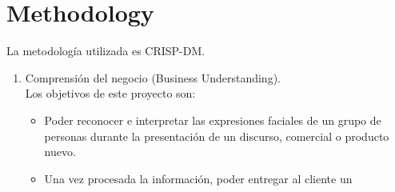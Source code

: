 
\section{Methodology}

La metodología utilizada es CRISP-DM.\@
\begin{enumerate}
      \item Comprensión del negocio (Business Understanding). \\Los objetivos de este
            proyecto son:
            \begin{itemize}
                  \item Poder reconocer e interpretar las expresiones faciales de un grupo de personas
                        durante la presentación de un discurso, comercial o producto nuevo.
                  \item Una vez procesada la información, poder entregar al cliente un
            \end{itemize}


\end{enumerate}
